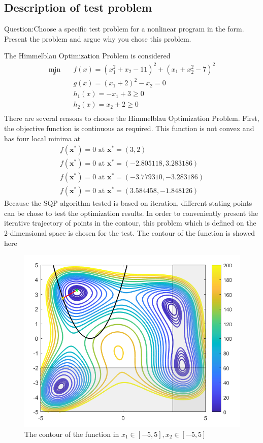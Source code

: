 \subsection{\bfseries Description of test problem}
\begin{shaded}
{Question:Choose a specific test problem for a nonlinear program in the form. Present
the problem and argue why you chose this problem.}
\end{shaded}
The Himmelblau Optimization Problem is considered
\begin{align*}
    \min_x \quad &f(x)=\left(x_1^2+x_2-11\right)^2+\left(x_1+x_2^2-7\right)^2\tag{5.12}\\
    &g(x)=\left(x_1+2\right)^2-x_2= 0\\
    &h_1(x)=-x_1+3\ge 0\\
    &h_2(x)=x_2+2\ge 0\\
\end{align*}
There are several reasons to choose the Himmelblau Optimization Problem. First,  the objective function is continuous as required. This function is not convex and has four local minima at 
$$\begin{array}{l}
f\left(\mathbf{x}^{*}\right)=0 \text { at } \mathbf{x}^{*}=(3,2) \\
f\left(\mathbf{x}^{*}\right)=0 \text { at } \mathbf{x}^{*}=(-2.805118,3.283186) \\
f\left(\mathbf{x}^{*}\right)=0 \text { at } \mathbf{x}^{*}=(-3.779310,-3.283186) \\
f\left(\mathbf{x}^{*}\right)=0 \text { at } \mathbf{x}^{*}=(3.584458,-1.848126)
\end{array}$$
Because the SQP algorithm tested is based on iteration, different stating points can be chose to test the optimization results. In order to conveniently present the iterative trajectory of points in the contour, this problem which is defined on the 2-dimensional space is chosen for the test.
The contour of the function is showed here
\begin{figure}[H]
\centering
\includegraphics[scale=0.5]{figures/HB_map1.PNG}
\caption{The contour of the function in $x_1\in[-5, 5],x_2\in[-5,5]$}
\label{fig:labe5.4.1}
\end{figure}
